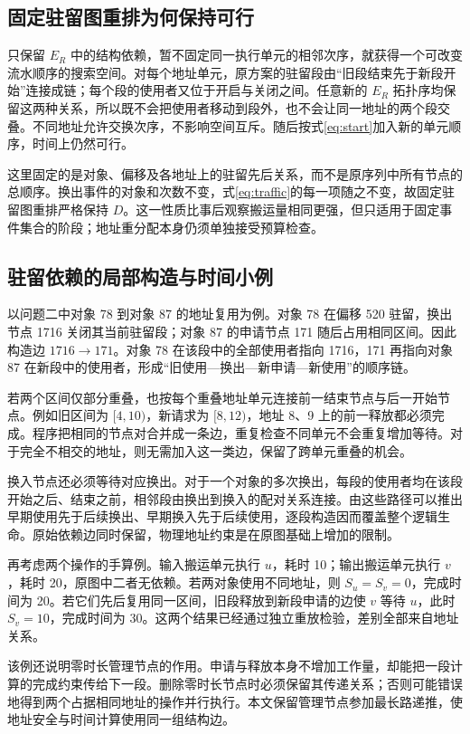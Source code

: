 \subsection{固定驻留图重排为何保持可行}
只保留 $E_R$ 中的结构依赖，暂不固定同一执行单元的相邻次序，就获得一个可改变流水顺序的搜索空间。对每个地址单元，原方案的驻留段由“旧段结束先于新段开始”连接成链；每个段的使用者又位于开启与关闭之间。任意新的 $E_R$ 拓扑序均保留这两种关系，所以既不会把使用者移动到段外，也不会让同一地址的两个段交叠。不同地址允许交换次序，不影响空间互斥。随后按式\eqref{eq:start}加入新的单元顺序，时间上仍然可行。

这里固定的是对象、偏移及各地址上的驻留先后关系，而不是原序列中所有节点的总顺序。换出事件的对象和次数不变，式\eqref{eq:traffic}的每一项随之不变，故固定驻留图重排严格保持 $D$。这一性质比事后观察搬运量相同更强，但只适用于固定事件集合的阶段；地址重分配本身仍须单独接受预算检查。

\subsection{驻留依赖的局部构造与时间小例}
以问题二中对象 78 到对象 87 的地址复用为例。对象 78 在偏移 520 驻留，换出节点 1716 关闭其当前驻留段；对象 87 的申请节点 171 随后占用相同区间。因此构造边 $1716\to171$。对象 78 在该段中的全部使用者指向 1716，171 再指向对象 87 在新段中的使用者，形成“旧使用—换出—新申请—新使用”的顺序链。

若两个区间仅部分重叠，也按每个重叠地址单元连接前一结束节点与后一开始节点。例如旧区间为 $[4,10)$，新请求为 $[8,12)$，地址 8、9 上的前一释放都必须完成。程序把相同的节点对合并成一条边，重复检查不同单元不会重复增加等待。对于完全不相交的地址，则无需加入这一类边，保留了跨单元重叠的机会。

换入节点还必须等待对应换出。对于一个对象的多次换出，每段的使用者均在该段开始之后、结束之前，相邻段由换出到换入的配对关系连接。由这些路径可以推出早期使用先于后续换出、早期换入先于后续使用，逐段构造因而覆盖整个逻辑生命。原始依赖边同时保留，物理地址约束是在原图基础上增加的限制。

再考虑两个操作的手算例。输入搬运单元执行 $u$，耗时 10；输出搬运单元执行 $v$，耗时 20，原图中二者无依赖。若两对象使用不同地址，则 $S_u=S_v=0$，完成时间为 20。若它们先后复用同一区间，旧段释放到新段申请的边使 $v$ 等待 $u$，此时 $S_v=10$，完成时间为 30。这两个结果已经通过独立重放检验，差别全部来自地址关系。

该例还说明零时长管理节点的作用。申请与释放本身不增加工作量，却能把一段计算的完成约束传给下一段。删除零时长节点时必须保留其传递关系；否则可能错误地得到两个占据相同地址的操作并行执行。本文保留管理节点参加最长路递推，使地址安全与时间计算使用同一组结构边。

